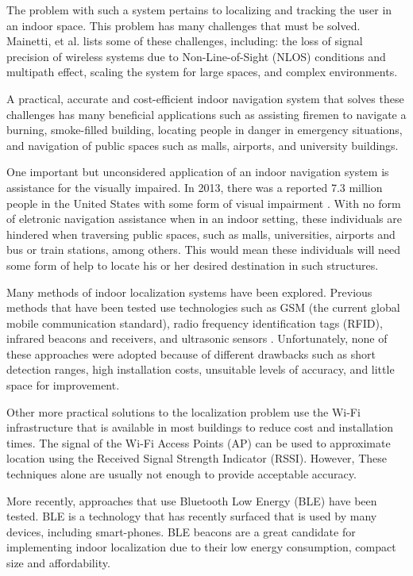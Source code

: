 \documentclass[conference]{IEEEtran}
\begin{document}
The problem with such a system pertains to localizing and tracking the user in an indoor space. This problem has many challenges that must be solved. Mainetti, et al. \cite{mainetti2014survey} lists some of these challenges, including: the loss of signal precision of wireless systems due to Non-Line-of-Sight (NLOS) conditions and multipath effect, scaling the system for large spaces, and complex environments.

A practical, accurate and cost-efficient indoor navigation system that solves these challenges has many beneficial applications such as assisting firemen to navigate a burning, smoke-filled building, locating people in danger in emergency situations, and navigation of public spaces such as malls, airports, and university buildings.

One important but unconsidered application of an indoor navigation system is assistance for the visually impaired. In 2013, there was a reported 7.3 million people in the United States with some form of visual impairment \cite{NFB}. With no form of eletronic navigation assistance when in an indoor setting, these individuals are hindered when traversing public spaces, such as malls, universities, airports and bus or train stations, among others. This would mean these individuals will need some form of help to locate his or her desired destination in such structures.

Many methods of indoor localization systems have been explored. Previous methods that have been tested use technologies such as GSM (the current global mobile communication standard), radio frequency identification tags (RFID), infrared beacons and receivers, and ultrasonic sensors \cite{otsason2005accurate,li2011performance,liu2014survey,ward1997new,medina2013ultrasound}. Unfortunately, none of these approaches were adopted because of different drawbacks such as short detection ranges, high installation costs, unsuitable levels of accuracy, and little space for improvement.

Other more practical solutions to the localization problem use the Wi-Fi infrastructure that is available in most buildings to reduce cost and installation times. The signal of the Wi-Fi Access Points (AP) can be used to approximate location using the Received Signal Strength Indicator (RSSI). However, These techniques alone are usually not enough to provide acceptable accuracy.

More recently, approaches that use Bluetooth Low Energy (BLE) have been tested. BLE is a technology that has recently surfaced that is used by many devices, including smart-phones. BLE beacons are a great candidate for implementing indoor localization due to their low energy consumption, compact size and affordability.
\end{document}
